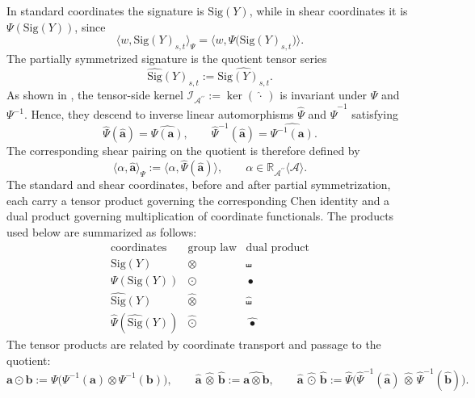 \documentclass{amsart}
\theoremstyle{definition}
\theoremstyle{remark}
\newcommand{\Sig}[1]{\mathrm{Sig}(#1)}
\newcommand{\Sigsym}[1]{\widehat{\mathrm{Sig}}(#1)}
\newcommand{\gammashuffle}{{\,\bullet\,}}
\newcommand{\gammashufflesym}{{\,\widehat{\gammashuffle}\,}}
\newcommand{\symmetrizer}{{\,\widehat{\cdot}\,}}
\begin{document}
In standard coordinates the signature is $\Sig{Y}$, while in shear
coordinates it is $\Psi(\Sig{Y})$, since
\[
    \big\langle
        w,
        \Sig{Y}_{s,t}
    \big\rangle_{\Psi}
    =
    \big\langle
        w,
        \Psi\bigl(\Sig{Y}_{s,t}\bigr)
    \big\rangle.
\]
The partially symmetrized signature is the quotient tensor series
\[
    \Sigsym{Y}_{s,t}
    :=
    \widehat{\Sig{Y}_{s,t}}.
\]
As shown in \cite{mainpaper}, the tensor-side kernel
$\mathcal{I}_{\mathcal{A}^{\prime\prime}}
:=
\ker(\symmetrizer)$
is invariant under $\Psi$ and $\Psi^{-1}$. Hence, they descend to inverse
linear automorphisms $\widehat{\Psi}$ and $\widehat{\Psi}^{-1}$ satisfying
\[
    \widehat{\Psi}(\widehat{\mathbf{a}})
    =
    \widehat{\Psi(\mathbf{a})},
    \qquad
    \widehat{\Psi}^{-1}(\widehat{\mathbf{a}})
    =
    \widehat{\Psi^{-1}(\mathbf{a})}.
\]
The corresponding shear pairing on the quotient is therefore defined by
\[
    \big\langle
        \alpha,
        \widehat{\mathbf{a}}
    \big\rangle_{\Psi}
    :=
    \big\langle
        \alpha,
        \widehat{\Psi}(\widehat{\mathbf{a}})
    \big\rangle,
    \qquad
    \alpha
    \in
    \mathbb{R}_{\mathcal{A}^{\prime\prime}}
    \langle\mathcal{A}\rangle.
\]
The standard and shear coordinates, before and after partial symmetrization,
each carry a tensor product governing the corresponding Chen
identity and a dual product governing multiplication of coordinate
functionals. The products used below are summarized as follows:
\[
\begin{array}{c|c|c}
    \text{coordinates}
    &
    \text{group law}
    &
    \text{dual product}
    \\
    \hline
    \Sig{Y}
    &
    \otimes
    &
    \shuffle
    \\
    \Psi(\Sig{Y})
    &
    \odot
    &
    \gammashuffle
    \\
    \Sigsym{Y}
    &
    \widehat{\otimes}
    &
    \widehat{\shuffle}
    \\
    \widehat{\Psi}(\Sigsym{Y})
    &
    \widehat{\odot}
    &
    \gammashufflesym
\end{array}
\]
The tensor products are related by coordinate transport and passage to the
quotient:
\[
    \mathbf{a}\odot\mathbf{b}
    :=
    \Psi
    \bigl(
        \Psi^{-1}(\mathbf{a})
        \otimes
        \Psi^{-1}(\mathbf{b})
    \bigr),
    \qquad
    \widehat{\mathbf{a}}
    \,\widehat{\otimes}\,
    \widehat{\mathbf{b}}
    :=
    \widehat{\mathbf{a}\otimes\mathbf{b}},
    \qquad
    \widehat{\mathbf{a}}
    \,\widehat{\odot}\,
    \widehat{\mathbf{b}}
    :=
    \widehat{\Psi}
    \bigl(
        \widehat{\Psi}^{-1}(\widehat{\mathbf{a}})
        \,\widehat{\otimes}\,
        \widehat{\Psi}^{-1}(\widehat{\mathbf{b}})
    \bigr).
\]
\end{document}
